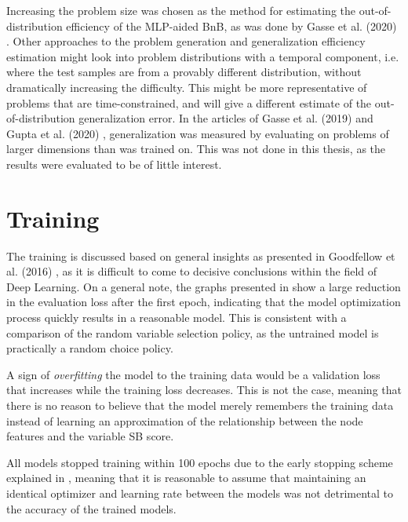 Increasing the problem size was chosen as the method for estimating the out-of-distribution efficiency of the \gls{MLP}-aided \gls{BnB}, as was done by Gasse et al. (2020) \cite{gasse2019exact}. Other approaches to the problem generation and generalization efficiency estimation might look into problem distributions with a temporal component, i.e. where the test samples are from a provably different distribution, without dramatically increasing the difficulty. This might be more representative of problems that are time-constrained, and will give a different estimate of the out-of-distribution generalization error. In the articles of Gasse et al. (2019) \cite{gasse2019exact} and Gupta et al. (2020) \cite{gupta2020hybrid}, generalization was measured by evaluating on problems of larger dimensions than was trained on. This was not done in this thesis, as the results were evaluated to be of little interest. 




\section{Training}\label{sec:disc_training}

The training is discussed based on general insights as presented in Goodfellow et al. (2016) \cite{goodfellow2016deep}, as it is difficult to come to decisive conclusions within the field of Deep Learning. On a general note, the graphs presented in  show a large reduction in the evaluation loss after the first epoch, indicating that the model optimization process quickly results in a reasonable model. This is consistent with a comparison of the random variable selection policy, as the untrained model is practically a random choice policy.  

A sign of \textit{overfitting} the model to the training data would be a validation loss that increases while the training loss decreases. This is not the case, meaning that there is no reason to believe that the model merely remembers the training data instead of learning an approximation of the relationship between the node features and the variable \gls{SB} score. 

All models stopped training within 100 epochs due to the early stopping scheme explained in , meaning that it is reasonable to assume that maintaining an identical optimizer and learning rate between the models was not detrimental to the accuracy of the trained models.  




